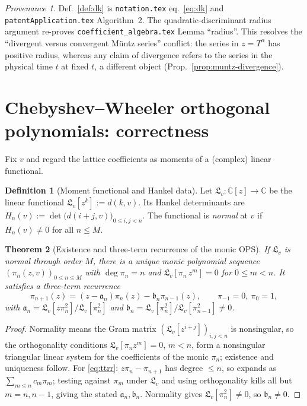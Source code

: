 \documentclass[11pt]{article}
\DeclareMathOperator{\dg}{deg}
\newcommand{\C}{\mathbb{C}}
\theoremstyle{plain}
\newtheorem{theorem}{Theorem}[section]
\theoremstyle{definition}
\newtheorem{definition}[theorem]{Definition}
\theoremstyle{remark}
\newtheorem*{provenance}{Provenance}
\begin{document}
\begin{provenance}
Def.~\ref{def:dk} is \texttt{notation.tex} eq.~\eqref{eq:dk} and
\texttt{patentApplication.tex} Algorithm~2. The quadratic-discriminant radius
argument re-proves \texttt{coefficient\_algebra.tex} Lemma ``radius''. This
resolves the ``divergent versus convergent Müntz series'' conflict: the series in
$z=T^\alpha$ has positive radius, whereas any claim of divergence refers to the
series in the physical time $t$ at fixed $t$, a different object
(Prop.~\ref{prop:muntz-divergence}).
\end{provenance}

\section{Chebyshev--Wheeler orthogonal polynomials: correctness}
\label{sec:wheeler}

Fix $v$ and regard the lattice coefficients as moments of a (complex) linear
functional.

\begin{definition}[Moment functional and Hankel data]\label{def:moment}
Let $\mathfrak L_v:\C[z]\to\C$ be the linear functional
$\mathfrak L_v[z^k]:=d(k,v)$. Its Hankel determinants are
$H_n(v):=\det\bigl(d(i+j,v)\bigr)_{0\le i,j<n}$. The functional is \emph{normal}
at $v$ if $H_n(v)\neq0$ for all $n\le M$.
\end{definition}

\begin{theorem}[Existence and three-term recurrence of the monic OPS]
\label{thm:ops}
If $\mathfrak L_v$ is normal through order $M$, there is a unique monic
polynomial sequence $(\pi_n(z,v))_{0\le n\le M}$ with $\dg\pi_n=n$ and
$\mathfrak L_v[\pi_n\,z^m]=0$ for $0\le m<n$. It satisfies a three-term recurrence
\begin{equation}\label{eq:ttrr}
   \pi_{n+1}(z)=(z-\mathfrak a_n)\pi_n(z)-\mathfrak b_n\pi_{n-1}(z),\qquad
   \pi_{-1}=0,\ \pi_0=1,
\end{equation}
with $\mathfrak a_n=\mathfrak L_v[z\pi_n^2]/\mathfrak L_v[\pi_n^2]$ and
$\mathfrak b_n=\mathfrak L_v[\pi_n^2]/\mathfrak L_v[\pi_{n-1}^2]\neq0$.
\end{theorem}
\begin{proof}
Normality means the Gram matrix $(\mathfrak L_v[z^{i+j}])_{i,j<n}$ is nonsingular,
so the orthogonality conditions $\mathfrak L_v[\pi_n z^m]=0$, $m<n$, form a
nonsingular triangular linear system for the coefficients of the monic $\pi_n$;
existence and uniqueness follow. For \eqref{eq:ttrr}: $z\pi_n-\pi_{n+1}$ has degree
$\le n$, so expands as $\sum_{m\le n}c_m\pi_m$; testing against $\pi_m$ under
$\mathfrak L_v$ and using orthogonality kills all but $m=n,n-1$, giving the stated
$\mathfrak a_n,\mathfrak b_n$. Normality gives $\mathfrak L_v[\pi_n^2]\neq0$, so
$\mathfrak b_n\neq0$.
\end{proof}
\end{document}
